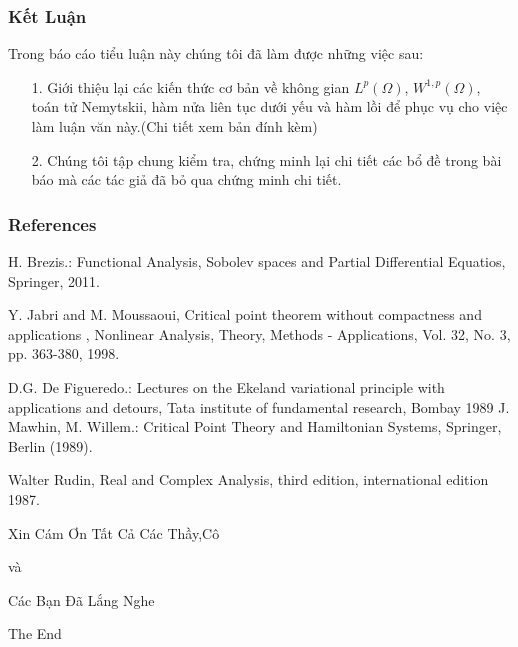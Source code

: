 \documentclass{beamer}
\begin{document}
\begin{frame}
\frametitle{Kết Luận}
Trong báo cáo tiểu luận này chúng tôi đã làm được những việc sau:
\begin{itemize}
\item[1.] Giới thiệu lại các kiến thức cơ bản về không gian $L^{p}(\Omega)$, $W^{1,p}(\Omega)$, toán tử Nemytskii, hàm nửa liên tục dưới yếu và hàm lồi để phục vụ cho việc làm luận văn này.(Chi tiết xem bản đính kèm)
\item [2.] Chúng tôi tập chung kiểm tra, chứng minh  lại chi tiết các bổ đề trong bài báo \cite{YJMM} mà các tác giả đã bỏ qua chứng minh chi tiết.
\end{itemize}

\end{frame}
\begin{frame}
\frametitle{References}
\indent
\begin{thebibliography}{10}


 H. Brezis.: Functional Analysis, Sobolev spaces
and Partial Differential Equatios, Springer, 2011.

 Y. Jabri and M. Moussaoui, Critical point theorem without compactness and applications , Nonlinear Analysis, Theory, Methods  - Applications, Vol. 32, No. 3, pp. 363-380, 1998.

 D.G. De Figueredo.: Lectures on the Ekeland variational
principle with applications and detours, Tata institute of fundamental
research, Bombay 1989
 J. Mawhin, M. Willem.: Critical Point Theory and
Hamiltonian Systems, Springer, Berlin (1989). 

 Walter Rudin, Real and Complex Analysis, third edition, international edition 1987.
\end{thebibliography}
\end{frame}

\begin{frame}
\Huge{\centerline{Xin Cám Ơn Tất Cả Các Thầy,Cô}}
\Huge{\centerline{và}}
\Huge{\centerline{Các Bạn Đã Lắng Nghe}}
\end{frame}



\begin{frame}
\Huge{\centerline{The End}}
\end{frame}

\end{document}

